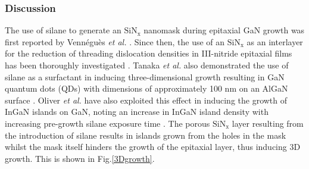 \subsubsection{Discussion}
\label{discussSiN}
The use of silane to generate an $\mathrm{SiN_{x}}$ nanomask during epitaxial GaN growth was first reported by Venn\'egu\`es \textit{et al.} \cite{Vennegues1998}. Since then, the use of an $\mathrm{SiN_{x}}$ as an interlayer for the reduction of threading dislocation densities in III-nitride epitaxial films has been thoroughly investigated \cite{Bottcher2003,Kappers2007,Johnston2009}. Tanaka \textit{et al.} also demonstrated the use of silane as a surfactant in inducing three-dimensional growth resulting in GaN quantum dots (QDs) with dimensions of approximately 100 nm on an AlGaN surface \cite{Tanaka1996}. Oliver \textit{et al.} have also exploited this effect in inducing the growth of InGaN islands on GaN, noting an increase in InGaN island density with increasing pre-growth silane exposure time \cite{OliverVanderLaakKappersEtAl2008}. The porous $\mathrm{SiN_{x}}$ layer resulting from the introduction of silane results in islands grown from the holes in the mask whilst the mask itself hinders the growth of the epitaxial layer, thus inducing 3D growth. This is shown in Fig.\ref{3Dgrowth}.

